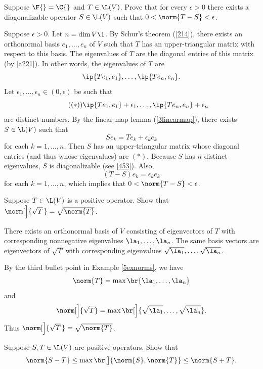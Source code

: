 \exercise
Suppose $\F{} = \C{}$ and $T \in \L(V)$. Prove that for every $\epsilon > 0$ there exists a diagonalizable operator $S \in \L(V)$ such that $0 < \norm{T - S} < \epsilon$.

\begin{Solution}
Suppose $\epsilon > 0$. Let $n = \dim V\1$. By Schur's theorem (\ref{214}), there exists an orthonormal basis $e_1, \ldots, e_n$ of $V$ such that $T$ has an upper-triangular matrix with respect to this basis. The eigenvalues of $T$ are the diagonal entries of this matrix (by \ref{a221}). In other words, the eigenvalues of $T$ are
\[
\ip{Te_1, e_1}, \ldots, \ip{Te_n,e_n}.
\]
Let $\epsilon_1, \ldots, \epsilon_n \in (0, \epsilon)$ be such that
\[ \tag{$(*)$}
\ip{Te_1, e_1} + \epsilon_1, \ldots, \ip{Te_n,e_n} + \epsilon_n
\]
are distinct numbers. By the linear map lemma (\ref{3linearmap}), there exists $S \in \L(V)$ such that
\[
Se_k = Te_k + \epsilon_k e_k
\]
for each $k = 1, \ldots, n$. Then $S$ has an upper-triangular matrix whose diagonal entries (and thus whose eigenvalues) are $(*)$. Because $S$ has $n$ distinct eigenvalues, $S$ is diagonalizable (see \ref{453}). Also,
\[
(T-S)e_k = \epsilon_k e_k
\]
for each $k= 1, \ldots, n$, which implies that $0 < \norm{T - S} < \epsilon$.
\end{Solution}

\exercise
Suppose $T \in \L(V)$ is a positive operator. Show that $\norm[\Big]{\sqrt{T}\,} = \sqrt{\norm{T}}$.

\begin{Solution}
There exists an orthonormal basis of $V$ consisting of eigenvectors of $T$ with corresponding nonnegative eigenvalues
$\la_1, \ldots, \la_n$. The same basis vectors are eigenvectors of $\sqrt{T}$ with corresponding eigenvalues
$\sqrt{\la_1}, \ldots, \sqrt{\la_n}$.

By the third bullet point in Example \ref{5exnorms}, we have
\[
\norm{T} = \max \br{ \la_1, \ldots, \la_n }
\]
and
\[
\norm[\Big]{\sqrt{T}} = \max \br[\Big]{ \sqrt{\la_1}, \ldots, \sqrt{\la_n} }.
\]
Thus $\norm[\Big]{\sqrt{T}\,} = \sqrt{\norm{T}}$.
\end{Solution}

\exercise
Suppose $S, T \in \L(V)$ are positive operators. Show that
\[
\norm{S-T} \le \max\br[\big]{ \norm{S}, \norm{T} } \le \norm{S+T}.
\]
\exercisedisplayend

